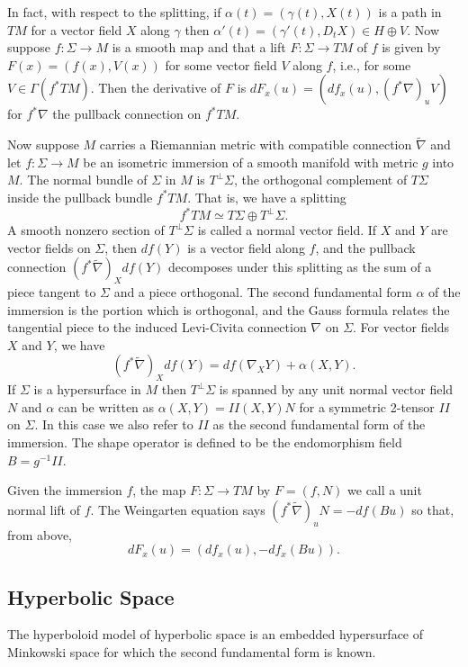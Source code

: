 \documentclass{amsart}
\newcommand{\two}{I\!\!I}
\numberwithin{equation}{section}
\begin{document}
In fact, with respect to the splitting, if $\alpha(t) = (\gamma(t),X(t))$ is a path in $TM$ for a vector field $X$ along $\gamma$ then $\alpha'(t) = (\gamma'(t),D_tX) \in H \oplus V$.
Now suppose $f:\Sigma \to M$ is a smooth map and that a lift $F: \Sigma \to TM$ of $f$ is given by $F(x) = (f(x),V(x))$ for some vector field $V$ along $f$, i.e., for some $V \in \Gamma(f^*TM)$.
Then the derivative of $F$ is $dF_x(u) = (df_x(u), (f^*\nabla)_u V)$ for $f^*\nabla$ the pullback connection on $f^*TM$.


Now suppose $M$ carries a Riemannian metric with compatible connection $\widetilde{\nabla}$ and let $f: \Sigma \to M$ be an isometric immersion of a smooth manifold with metric $g$ into $M$.
The normal bundle of $\Sigma$ in $M$ is $T^\perp\Sigma$, the orthogonal complement of $T\Sigma$ inside the pullback bundle $f^*TM$.
That is, we have a splitting
\[
f^*TM \simeq T\Sigma \oplus T^\perp\Sigma.
\]
A smooth nonzero section of $T^\perp\Sigma$ is called a normal vector field.
If $X$ and $Y$ are vector fields on $\Sigma$, then $df(Y)$ is a vector field along $f$, and the pullback connection $(f^*\widetilde{\nabla})_Xdf(Y)$ decomposes under this splitting as the sum of a piece tangent to $\Sigma$ and a piece orthogonal. 
The second fundamental form $\alpha$ of the immersion is the portion which is orthogonal, and the Gauss formula relates the tangential piece to the induced Levi-Civita connection $\nabla$ on $\Sigma$.
For vector fields $X$ and $Y$, we have
\[
(f^*\widetilde{\nabla})_Xdf(Y) = df(\nabla_XY) + \alpha(X,Y).
\]
If $\Sigma$ is a hypersurface in $M$ then $T^\perp\Sigma$ is spanned by any unit normal vector field $N$ and $\alpha$ can be written as $\alpha(X,Y) = \two(X,Y)N$ for a symmetric 2-tensor $\two$ on $\Sigma$.
In this case we also refer to $\two$ as the second fundamental form of the immersion. 
The shape operator is defined to be the endomorphism field $B = g^{-1}\two$.

Given the immersion $f$, the map $F: \Sigma \to TM$ by $F = (f,N)$ we call a unit normal lift of $f$.
The Weingarten equation says $(f^*\widetilde{\nabla})_uN = -df(Bu)$ so that, from above, 
\[
dF_x(u) = (df_x(u),-df_x(Bu)).
\]

\subsection{Hyperbolic Space}

The hyperboloid model of hyperbolic space is an embedded hypersurface of Minkowski space for which the second fundamental form is known. 
\end{document}
